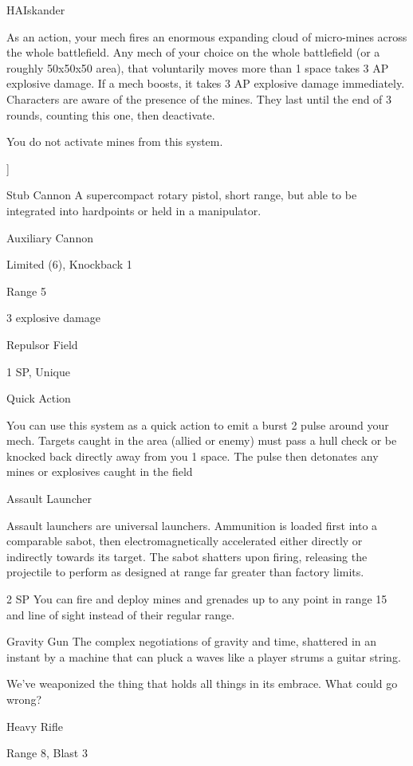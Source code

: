 \begin{mech}{HA}{Iskander}
{As an action, your mech fires an enormous expanding cloud of micro-mines across the whole battlefield. Any mech of your choice on the whole battlefield (or a roughly 50x50x50 area), that voluntarily moves more than 1 space takes 3 AP explosive damage. If a mech boosts, it takes 3 AP explosive damage immediately. Characters are aware of the presence of the mines. They last until the end of 3 rounds, counting this one, then deactivate.

You do not activate mines from this system.}]






Stub Cannon
A supercompact rotary pistol, short range, but able to be integrated into hardpoints or held in a manipulator.

Auxiliary Cannon

Limited (6), Knockback 1

Range 5

3 explosive damage

Repulsor Field


1 SP, Unique


Quick Action

You can use this system as a quick action to emit a burst 2 pulse around your mech. Targets caught in the area (allied or enemy) must pass a hull check or be knocked back directly away from you 1 space. The pulse then detonates any mines or explosives caught in the field


Assault Launcher

Assault launchers are universal launchers. Ammunition is loaded first into a comparable sabot, then electromagnetically accelerated either directly or indirectly towards its target. The sabot shatters upon firing, releasing the projectile to perform as designed at range far greater than factory limits.

2 SP
You can fire and deploy mines and grenades up to any point in range 15 and line of sight instead of their regular range.





Gravity Gun
The complex negotiations of gravity and time, shattered in an instant by a machine that can pluck a waves like a player strums a guitar string.

We’ve weaponized the thing that holds all things in its embrace. What could go wrong?

Heavy Rifle

Range 8, Blast 3


\end{mech}
